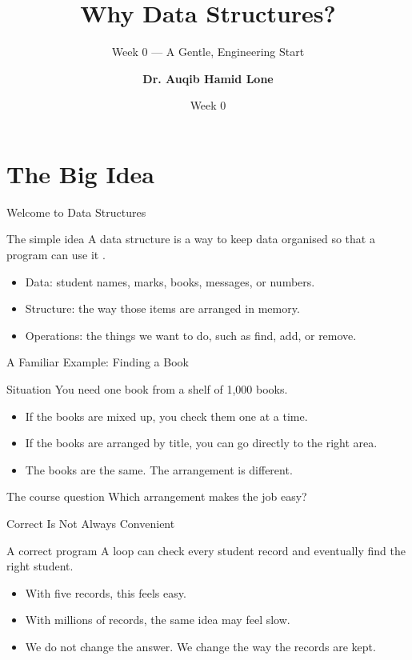 \documentclass[aspectratio=169]{beamer}
\title{Why Data Structures?}
\subtitle{Week 0 --- A Gentle, Engineering Start}
\author[Dr. Auqib Hamid Lone]{\textbf{Dr. Auqib Hamid Lone}}
\institute[GCET Ganderbal]{PCC CS-301: Data Structures\\GCET, Ganderbal}
\date[Week 0]{\small Week 0}
\begin{document}
\frame{\titlepage}

\section{The Big Idea}

\begin{frame}{Welcome to Data Structures}
  \begin{block}{The simple idea}
    A data structure is a way to keep data organised so that a program can use it
    \cite{Sedgewick2011_algorithms,Karumanchi2017_data_structures_algorithms_made_easy}.
  \end{block}
  \begin{itemize}
    \item Data: student names, marks, books, messages, or numbers.
    \item Structure: the way those items are arranged in memory.
    \item Operations: the things we want to do, such as find, add, or remove.
  \end{itemize}
  \vspace{0.2cm}
\end{frame}

\begin{frame}{A Familiar Example: Finding a Book}
  \begin{block}{Situation}
    You need one book from a shelf of 1,000 books.
  \end{block}
  \begin{itemize}
    \item If the books are mixed up, you check them one at a time.
    \item If the books are arranged by title, you can go directly to the right area.
    \item The books are the same. The arrangement is different.
  \end{itemize}
  \begin{exampleblock}{The course question}
    Which arrangement makes the job easy?
  \end{exampleblock}
\end{frame}

\begin{frame}{Correct Is Not Always Convenient}
  \begin{block}{A correct program}
    A loop can check every student record and eventually find the right student.
  \end{block}
  \begin{itemize}
    \item With five records, this feels easy.
    \item With millions of records, the same idea may feel slow.
    \item We do not change the answer. We change the way the records are kept.
  \end{itemize}
  \vspace{0.15cm}
\end{frame}
\end{document}
